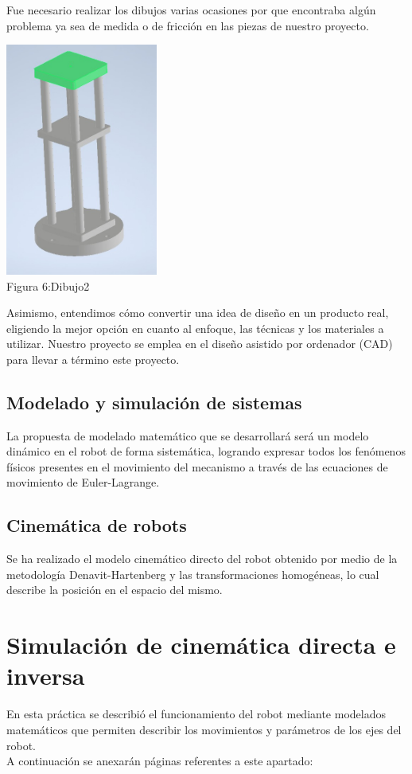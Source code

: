 \documentclass[11pt,a4paper,oldfontcommands,oneside]{memoir}
\begin{document}
Fue necesario realizar los dibujos varias ocasiones por que encontraba algún problema ya sea de medida o de fricción en las piezas de nuestro proyecto.\\
\begin{center}
\includegraphics[width=5cm]{Dibujo2.jpeg}
 \\
 Figura 6:Dibujo2
\end{center}

Asimismo, entendimos cómo convertir una idea de diseño en un producto real, eligiendo la mejor opción en cuanto al enfoque, las técnicas y los materiales a utilizar. Nuestro proyecto se emplea en el diseño asistido por ordenador (CAD) para llevar a término este proyecto.

\subsection{Modelado y simulación de sistemas}
La propuesta de modelado matemático que se desarrollará será un modelo dinámico en el robot de forma sistemática, logrando expresar todos los fenómenos físicos presentes en el movimiento del mecanismo a través de las ecuaciones de movimiento de Euler-Lagrange.

\subsection{Cinemática de robots}
Se ha realizado el modelo cinemático directo del robot obtenido por medio de la metodología Denavit-Hartenberg y las transformaciones homogéneas, lo cual describe la posición en el espacio del mismo.

\section{Simulación de cinemática directa e inversa}
En esta práctica se describió el funcionamiento del robot mediante modelados matemáticos que permiten describir los movimientos y parámetros de los ejes del robot.\\
A continuación se anexarán páginas referentes a este apartado:
\end{document}
